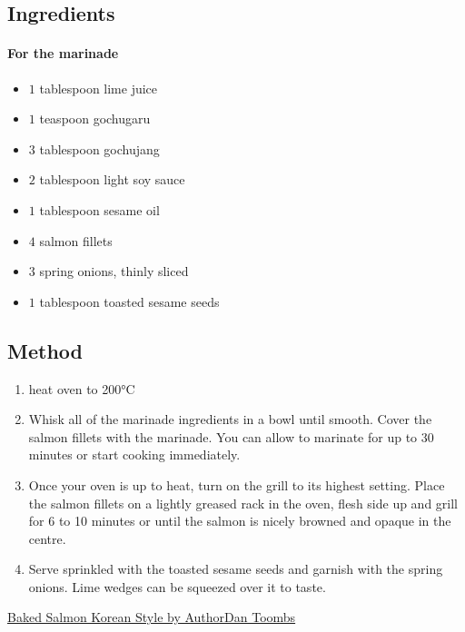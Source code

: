 \documentclass[11pt,a4paper]{article}
\begin{document}
\subsection*{Ingredients}

\begin{multicols}{2}

\paragraph*{For the marinade}

\begin{itemize}
  \item $ 1 $ tablespoon lime juice
  \item $ 1 $ teaspoon gochugaru
  \item $ 3 $ tablespoon gochujang
  \item $ 2 $ tablespoon light soy sauce
  \item $ 1 $ tablespoon sesame oil
\end{itemize}
  
\columnbreak

\begin{itemize}
  \item $ 4 $ salmon fillets
  \item $ 3 $ spring onions, thinly sliced
  \item $ 1 $ tablespoon toasted sesame seeds
\end{itemize}

\end{multicols}

\medskip

\subsection*{Method}

\begin{enumerate}
  \item heat oven to 200\si{\celsius}
  \item Whisk all of the marinade ingredients in a bowl until smooth. Cover the salmon fillets with the marinade. You can allow to marinate for up to 30 minutes or start cooking immediately.
  \item Once your oven is up to heat, turn on the grill to its highest setting. Place the salmon fillets on a lightly greased rack in the oven, flesh side up and grill for 6 to 10 minutes or until the salmon is nicely browned and opaque in the centre.
  \item Serve sprinkled with the toasted sesame seeds and garnish with the spring onions. Lime wedges can be squeezed over it to taste.
\end{enumerate}

\href{https://greatcurryrecipes.net/2022/08/31/baked-salmon-korean-style/}{Baked Salmon Korean Style by AuthorDan Toombs}
\end{document}

